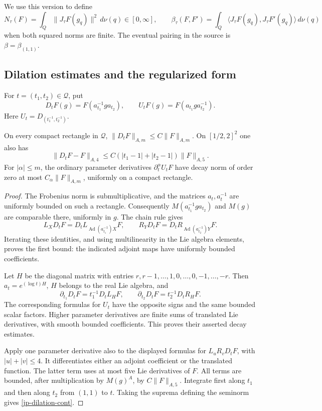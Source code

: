 We use this version to define
\[
 N_\tau(F)=\int_Q\|J_\tau F(g_q)\|^2\,d\nu(q)\in[0,\infty],
 \qquad
 \beta_\tau(F,F')=
       \int_Q\langle J_\tau F(g_q),J_\tau F'(g_q)\rangle\,d\nu(q)
\]
when both squared norms are finite.
The eventual pairing in the source is \(\beta=\beta_{(1,1)}\).

\subsection{Dilation estimates and the regularized form}

For \(t=(t_1,t_2)\in\mathcal Q\), put
\[
 D_tF(g)=F(a_{t_1}^{-1}g a_{t_2}),\qquad
 U_tF(g)=F(a_{t_1}g a_{t_2}^{-1}).
\]
Here \(U_t=D_{(t_1^{-1},t_2^{-1})}\).

\begin{lemma}\label{jp-dilation-seminorm}
On every compact rectangle in \(\mathcal Q\),
\(\|D_tF\|_{A,m}\leq C\|F\|_{A,m}\).
On \([1/2,2]^2\) one also has
\begin{equation}\label{jp-dilation-cont}
 \|D_tF-F\|_{A,4}
       \leq C(|t_1-1|+|t_2-1|)\|F\|_{A,5}.
\end{equation}
For \(|\alpha|\leq m\), the ordinary parameter derivatives
\(\partial_t^\alpha U_tF\) have decay norm of order zero at
most \(C_\alpha\|F\|_{A,m}\), uniformly on a compact rectangle.
\end{lemma}

\begin{proof}
The Frobenius norm is submultiplicative, and the matrices
\(a_t,a_t^{-1}\) are uniformly bounded on such a rectangle.
Consequently \(M(a_{t_1}^{-1}g a_{t_2})\) and \(M(g)\) are
comparable there, uniformly in \(g\).
The chain rule gives
\[
 L_XD_tF=D_t L_{\operatorname{Ad}(a_{t_1}^{-1})X}F,\qquad
 R_YD_tF=D_t R_{\operatorname{Ad}(a_{t_2}^{-1})Y}F.
\]
Iterating these identities, and using multilinearity in the
Lie algebra elements, proves the first bound: the indicated
adjoint maps have uniformly bounded coefficients.

Let \(H\) be the diagonal matrix with entries
\(r,r-1,\ldots,1,0,\ldots,0,-1,\ldots,-r\).
Then \(a_t=e^{(\log t)H}\), \(H\) belongs to the real Lie
algebra, and
\[
       \partial_{t_1}D_tF=t_1^{-1}D_tL_HF,\qquad
       \partial_{t_2}D_tF=t_2^{-1}D_tR_HF.
\]
The corresponding formulas for \(U_t\) have the opposite
signs and the same bounded scalar factors.
Higher parameter derivatives are finite sums of translated
Lie derivatives, with smooth bounded coefficients.
This proves their asserted decay estimates.

Apply one parameter derivative also to the displayed formulas
for \(L_uR_vD_tF\), with \(|u|+|v|\leq4\).
It differentiates either an adjoint coefficient or the
translated function.  The latter term uses at most five
Lie derivatives of \(F\).  All terms are bounded, after
multiplication by \(M(g)^A\), by \(C\|F\|_{A,5}\).
Integrate first along \(t_1\) and then along \(t_2\) from
\((1,1)\) to \(t\).  Taking the suprema defining the
seminorm gives \eqref{jp-dilation-cont}.
\end{proof}

